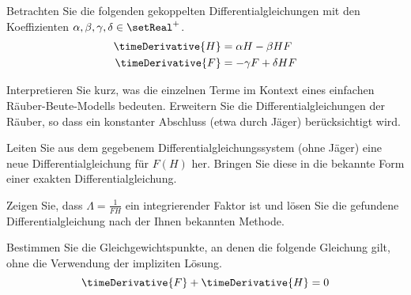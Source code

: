 \begin{atiTask}[
  title = Räuber und Beute
]
  Betrachten Sie die folgenden gekoppelten Differentialgleichungen mit den Koeffizienten $\alpha,\beta,\gamma,\delta\in\setReal^+$.
  \begin{align*}
    \timeDerivative{H} &= \alpha H - \beta HF \\
    \timeDerivative{F} &= -\gamma F + \delta HF
  \end{align*}
  \begin{atiSubtasks}
    \item{
      Interpretieren Sie kurz, was die einzelnen Terme im Kontext eines einfachen Räuber-Beute-Modells bedeuten.
      Erweitern Sie die Differentialgleichungen der Räuber, so dass ein konstanter Abschluss (etwa durch Jäger) berücksichtigt wird.
    }
    \item{
      Leiten Sie aus dem gegebenem Differentialgleichungssystem (ohne Jäger) eine neue Differentialgleichung für $F(H)$ her.
      Bringen Sie diese in die bekannte Form einer exakten Differentialgleichung.
    }
    \item{
      Zeigen Sie, dass $\Lambda = \frac{1}{FH}$ ein integrierender Faktor ist und lösen Sie die gefundene Differentialgleichung nach der Ihnen bekannten Methode.
    }
    \item{
      Bestimmen Sie die Gleichgewichtspunkte, an denen die folgende Gleichung gilt, ohne die Verwendung der impliziten Lösung.
      \[
        \timeDerivative{F} + \timeDerivative{H} = 0
      \]
    }
  \end{atiSubtasks}
\end{atiTask}